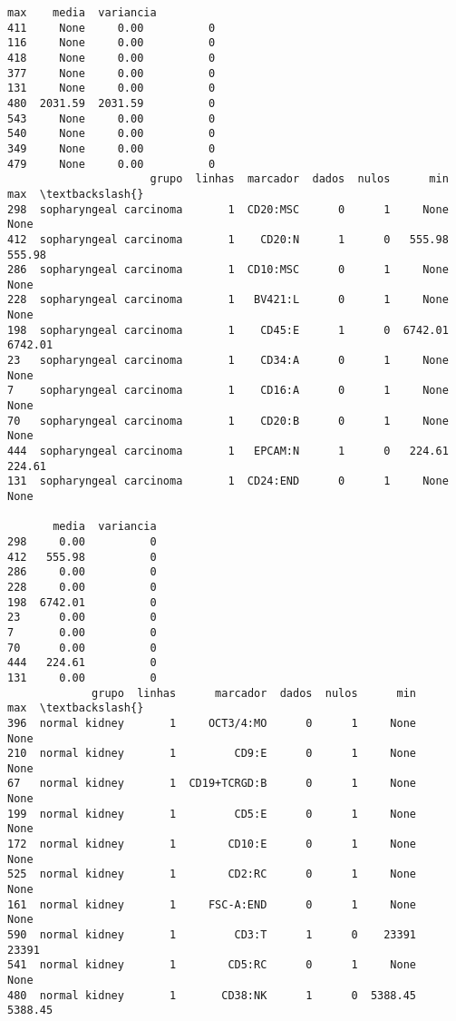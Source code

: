 \documentclass[11pt]{article}
\begin{document}
\begin{Verbatim}[commandchars=\\\{\}]
         max    media  variancia  
411     None     0.00          0  
116     None     0.00          0  
418     None     0.00          0  
377     None     0.00          0  
131     None     0.00          0  
480  2031.59  2031.59          0  
543     None     0.00          0  
540     None     0.00          0  
349     None     0.00          0  
479     None     0.00          0  
                      grupo  linhas  marcador  dados  nulos      min      max  \textbackslash{}
298  sopharyngeal carcinoma       1  CD20:MSC      0      1     None     None   
412  sopharyngeal carcinoma       1    CD20:N      1      0   555.98   555.98   
286  sopharyngeal carcinoma       1  CD10:MSC      0      1     None     None   
228  sopharyngeal carcinoma       1   BV421:L      0      1     None     None   
198  sopharyngeal carcinoma       1    CD45:E      1      0  6742.01  6742.01   
23   sopharyngeal carcinoma       1    CD34:A      0      1     None     None   
7    sopharyngeal carcinoma       1    CD16:A      0      1     None     None   
70   sopharyngeal carcinoma       1    CD20:B      0      1     None     None   
444  sopharyngeal carcinoma       1   EPCAM:N      1      0   224.61   224.61   
131  sopharyngeal carcinoma       1  CD24:END      0      1     None     None   

       media  variancia  
298     0.00          0  
412   555.98          0  
286     0.00          0  
228     0.00          0  
198  6742.01          0  
23      0.00          0  
7       0.00          0  
70      0.00          0  
444   224.61          0  
131     0.00          0  
             grupo  linhas      marcador  dados  nulos      min      max  \textbackslash{}
396  normal kidney       1     OCT3/4:MO      0      1     None     None   
210  normal kidney       1         CD9:E      0      1     None     None   
67   normal kidney       1  CD19+TCRGD:B      0      1     None     None   
199  normal kidney       1         CD5:E      0      1     None     None   
172  normal kidney       1        CD10:E      0      1     None     None   
525  normal kidney       1        CD2:RC      0      1     None     None   
161  normal kidney       1     FSC-A:END      0      1     None     None   
590  normal kidney       1         CD3:T      1      0    23391    23391   
541  normal kidney       1        CD5:RC      0      1     None     None   
480  normal kidney       1       CD38:NK      1      0  5388.45  5388.45   


\end{Verbatim}
\end{document}

